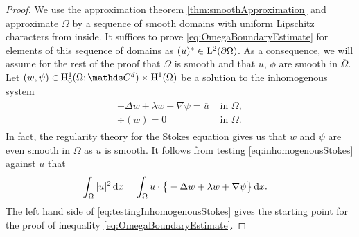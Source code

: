 \begin{proof}
  We use the approximation theorem \ref{thm:smoothApproximation} and approximate $\Omega$ by a sequence of smooth domains with uniform Lipschitz characters from inside.
  It suffices to prove \eqref{eq:OmegaBoundaryEstimate} for elements of this sequence of domains as $(u)^* \in \mathrm{L}^2(\partial\Omega)$.
  As a consequence, we will assume for the rest of the proof that $\Omega$ is smooth and that $u$, $\phi$ are smooth in $\overline\Omega$.
  Let $(w,\psi) \in \HH_0^1(\Omega; \C^d) \times \HH^1(\Omega)$ be a solution to the inhomogenous system
  \begin{align}
    \label{eq:inhomogenousStokes}
    \begin{alignedat}{1}
      - \Delta w + \lambda w + \nabla \psi = \overline u &\text{ in } \Omega, \\
      \div(w) = 0 &\text{ in } \Omega.
    \end{alignedat}
  \end{align}
  In fact, the regularity theory for the Stokes equation gives us that $w$ and $\psi$ are even smooth in $\Omega$ as $\overline u$ is smooth.
  It follows from testing \eqref{eq:inhomogenousStokes} against $u$ that
  \begin{align}
    \label{eq:testingInhomogenousStokes}
    \int_\Omega |u|^2 \, {\operatorname{d}\!{x}}
    &= \int_\Omega u \cdot \big\{ - \Delta w + \lambda w + \nabla \psi \big\} \, {\operatorname{d}\!{x}}.
  \end{align}
  The left hand side of \eqref{eq:testingInhomogenousStokes} gives the starting point for the proof of inequality \eqref{eq:OmegaBoundaryEstimate}.
  

\end{proof}
